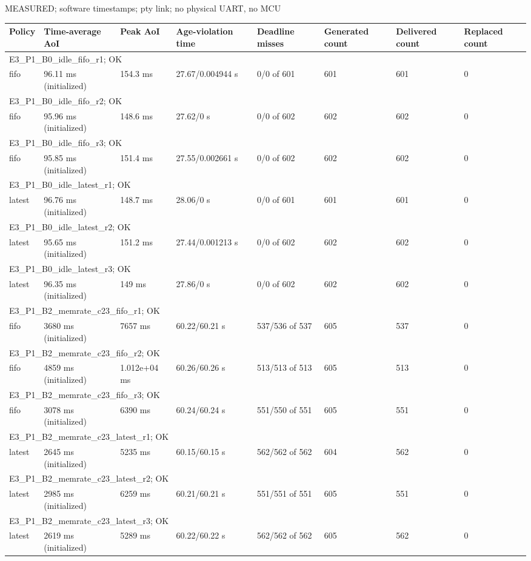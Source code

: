 \par\noindent MEASURED; software timestamps; pty link; no physical UART, no MCU\par
\begin{tabular}{llllllll}
\toprule
Policy & Time-average AoI & Peak AoI & Age-violation time & Deadline misses & Generated count & Delivered count & Replaced count \\
\midrule
\multicolumn{8}{l}{E3\_P1\_B0\_idle\_fifo\_r1; OK} \\
fifo & 96.11 ms (initialized) & 154.3 ms & 27.67/0.004944 s & 0/0 of 601 & 601 & 601 & 0 \\
\multicolumn{8}{l}{E3\_P1\_B0\_idle\_fifo\_r2; OK} \\
fifo & 95.96 ms (initialized) & 148.6 ms & 27.62/0 s & 0/0 of 602 & 602 & 602 & 0 \\
\multicolumn{8}{l}{E3\_P1\_B0\_idle\_fifo\_r3; OK} \\
fifo & 95.85 ms (initialized) & 151.4 ms & 27.55/0.002661 s & 0/0 of 602 & 602 & 602 & 0 \\
\multicolumn{8}{l}{E3\_P1\_B0\_idle\_latest\_r1; OK} \\
latest & 96.76 ms (initialized) & 148.7 ms & 28.06/0 s & 0/0 of 601 & 601 & 601 & 0 \\
\multicolumn{8}{l}{E3\_P1\_B0\_idle\_latest\_r2; OK} \\
latest & 95.65 ms (initialized) & 151.2 ms & 27.44/0.001213 s & 0/0 of 602 & 602 & 602 & 0 \\
\multicolumn{8}{l}{E3\_P1\_B0\_idle\_latest\_r3; OK} \\
latest & 96.35 ms (initialized) & 149 ms & 27.86/0 s & 0/0 of 602 & 602 & 602 & 0 \\
\multicolumn{8}{l}{E3\_P1\_B2\_memrate\_c23\_fifo\_r1; OK} \\
fifo & 3680 ms (initialized) & 7657 ms & 60.22/60.21 s & 537/536 of 537 & 605 & 537 & 0 \\
\multicolumn{8}{l}{E3\_P1\_B2\_memrate\_c23\_fifo\_r2; OK} \\
fifo & 4859 ms (initialized) & 1.012e+04 ms & 60.26/60.26 s & 513/513 of 513 & 605 & 513 & 0 \\
\multicolumn{8}{l}{E3\_P1\_B2\_memrate\_c23\_fifo\_r3; OK} \\
fifo & 3078 ms (initialized) & 6390 ms & 60.24/60.24 s & 551/550 of 551 & 605 & 551 & 0 \\
\multicolumn{8}{l}{E3\_P1\_B2\_memrate\_c23\_latest\_r1; OK} \\
latest & 2645 ms (initialized) & 5235 ms & 60.15/60.15 s & 562/562 of 562 & 604 & 562 & 0 \\
\multicolumn{8}{l}{E3\_P1\_B2\_memrate\_c23\_latest\_r2; OK} \\
latest & 2985 ms (initialized) & 6259 ms & 60.21/60.21 s & 551/551 of 551 & 605 & 551 & 0 \\
\multicolumn{8}{l}{E3\_P1\_B2\_memrate\_c23\_latest\_r3; OK} \\
latest & 2619 ms (initialized) & 5289 ms & 60.22/60.22 s & 562/562 of 562 & 605 & 562 & 0 \\
\bottomrule
\end{tabular}
